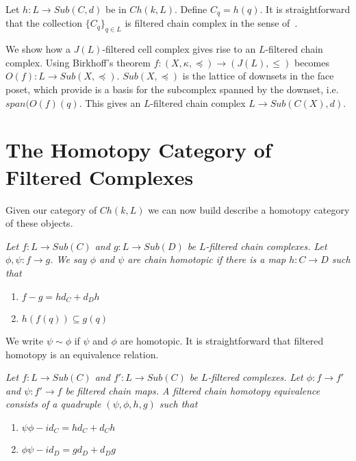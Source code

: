\begin{rem}
Let $h:L\to Sub(C,d)$ be in $Ch(k,L)$.  Define $C_q = h(q)$. It is straightforward that the collection $\{C_q\}_{q\in L}$ is filtered chain complex in the sense of~\cite[Section 7]{salamon}.
\end{rem}


We show how a $J(L)$-filtered cell complex gives rise to an $L$-filtered chain complex.   Using Birkhoff's theorem $f:(X,\kappa,\preceq)\to (J(L),\leq)$ becomes $O(f):L\to Sub(X,\preceq)$.  $Sub(X,\preceq)$ is the lattice of downsets in the face poset, which provide is a basis for the subcomplex spanned by the downset, i.e. $span(O(f)(q)$.   This gives an $L$-filtered chain complex $L\to Sub(C(X),d)$.




\section{The Homotopy Category of Filtered Complexes}\label{sec:homotopy}

Given our category of $Ch(k,L)$ we can now build describe a homotopy category of these objects.

\begin{defn}
{\em
Let $f:L\to Sub(C)$ and $g:L\to Sub(D)$ be $L$-filtered chain complexes.  Let $\phi,\psi:f\to g$.  We say $\phi$ and $\psi$ are {\em chain homotopic} if there is a map $h:C\to D$ such that
\begin{enumerate}
\item $f-g = hd_C+d_Dh$
\item $h(f(q))\subseteq g(q)$
\end{enumerate}  
}
\end{defn}

We write $\psi\sim \phi$ if $\psi$ and $\phi$ are homotopic.  It is straightforward that filtered homotopy is an equivalence relation.  

\begin{defn}
{\em
Let $f:L\to Sub(C)$ and $f':L\to Sub(C)$ be $L$-filtered complexes.  Let $\phi:f\to f'$ and $\psi:f'\to f$ be filtered chain maps.  A filtered chain homotopy equivalence consists of a quadruple $(\psi,\phi,h,g)$ such that 
\begin{enumerate}
\item $\psi\phi-id_C= hd_C + d_Ch$
\item $\phi\psi-id_D = gd_D+d_Dg$
\end{enumerate}
}
\end{defn}


